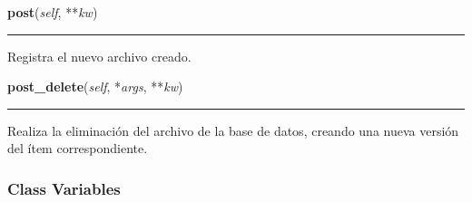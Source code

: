     \vspace{0.5ex}

\hspace{.8\funcindent}\begin{boxedminipage}{\funcwidth}

    \raggedright \textbf{post}(\textit{self}, **\textit{kw})

    \vspace{-1.5ex}

    \rule{\textwidth}{0.5\fboxrule}
\setlength{\parskip}{2ex}
    Registra el nuevo archivo creado.

\setlength{\parskip}{1ex}
    \end{boxedminipage}

    \label{saip:controllers:archivo_controller:ArchivoController:post_delete}

    \vspace{0.5ex}

\hspace{.8\funcindent}\begin{boxedminipage}{\funcwidth}

    \raggedright \textbf{post\_delete}(\textit{self}, *\textit{args}, **\textit{kw})

    \vspace{-1.5ex}

    \rule{\textwidth}{0.5\fboxrule}
\setlength{\parskip}{2ex}
    Realiza la eliminación del archivo de la base de datos, creando una 
    nueva versión del ítem correspondiente.

\setlength{\parskip}{1ex}
    \end{boxedminipage}



  \subsubsection{Class Variables}

